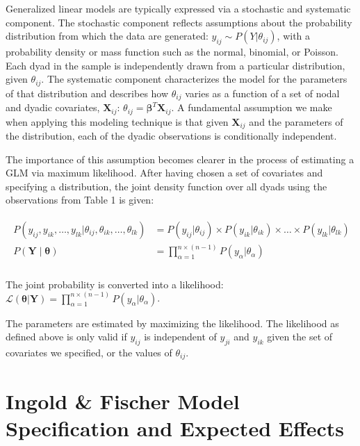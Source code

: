 \documentclass[12pt,pdflatex]{elsarticle}
\begin{document}
Generalized linear models are typically expressed via a stochastic and systematic component. The stochastic component reflects assumptions about the probability distribution from which the data are generated: $y_{ij} \sim P(Y | \theta_{ij})$, with a probability density or mass function such as the normal, binomial, or Poisson. Each dyad in the sample is independently drawn from a particular distribution, given $\theta_{ij}$. The systematic component characterizes the model for the parameters of that distribution and describes how $\theta_{ij}$ varies as a function of a set of nodal and dyadic covariates, $\mathbf{X}_{ij}$: $\theta_{ij} = \bm\beta^{T} \mathbf{X}_{ij}$. A fundamental assumption we make when applying this modeling technique is that given $\mathbf{X}_{ij}$ and the parameters of the distribution, each of the dyadic observations is conditionally independent.

The importance of this assumption becomes clearer in the process of estimating a GLM via maximum likelihood. After having chosen a set of covariates and specifying a distribution, the joint density function over all dyads using the observations from Table 1 is given:

\vspace{-8mm}
\begin{align}
\begin{aligned}
	P(y_{ij}, y_{ik}, \ldots, y_{lk} | \theta_{ij}, \theta_{ik}, \ldots, \theta_{lk}) &= P(y_{ij} | \theta_{ij}) \times P(y_{ik} | \theta_{ik}) \times \ldots \times P(y_{lk} | \theta_{lk}) \\
	P(\mathbf{Y} \; | \; \bm{\theta}) &= \prod_{\alpha=1}^{n \times (n-1)} P(y_{\alpha} | \theta_{\alpha})  \\
\end{aligned}
\end{align}

\noindent The joint probability is converted into a likelihood: $\displaystyle \mathcal{L} (\bm{\theta} | \mathbf{Y}) = \prod_{\alpha=1}^{n \times (n-1)} P(y_{\alpha} | \theta_{\alpha})$.

The parameters are estimated by maximizing the likelihood. The likelihood as defined above is only valid if  $y_{ij}$ is independent of $y_{ji}$ and $y_{ik}$ given the set of covariates we specified, or the values of $\theta_{ij}$.

\clearpage
\section*{Ingold \& Fischer Model Specification and Expected Effects}
\end{document}
